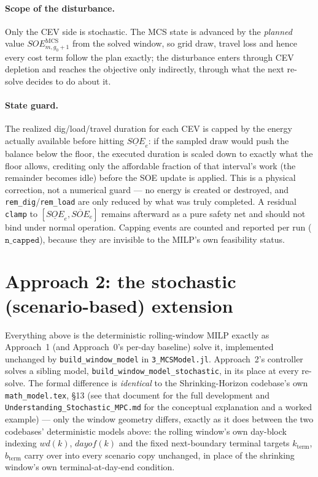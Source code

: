\documentclass[11pt]{article}
\begin{document}
\paragraph{Scope of the disturbance.} Only the CEV side is stochastic. The MCS state is advanced
by the \emph{planned} value $SOE^{\text{MCS}}_{m,g_0+1}$ from the solved window, so grid draw,
travel loss and hence every cost term follow the plan exactly; the disturbance enters through CEV
depletion and reaches the objective only indirectly, through what the next re-solve decides to do
about it.

\paragraph{State guard.} The realized dig/load/travel duration for each CEV is capped by the
energy actually available before hitting $\underline{SOE}_e$: if the sampled draw would push the
balance below the floor, the executed duration is scaled down to exactly what the floor allows,
crediting only the affordable fraction of that interval's work (the remainder becomes idle) before
the SOE update is applied. This is a physical correction, not a numerical guard — no energy is
created or destroyed, and \texttt{rem\_dig}/\texttt{rem\_load} are only reduced by what was truly
completed. A residual \texttt{clamp} to $[\underline{SOE}_e,\overline{SOE}_e]$ remains afterward as
a pure safety net and should not bind under normal operation. Capping events are counted and
reported per run ($\texttt{n\_capped}$), because they are invisible to the MILP's own feasibility
status.

\section{Approach 2: the stochastic (scenario-based) extension}
\label{sec:stochastic}
Everything above is the deterministic rolling-window MILP exactly as Approach~1 (and
Approach~0's per-day baseline) solve it, implemented unchanged by \texttt{build\_window\_model}
in \texttt{3\_MCSModel.jl}. Approach~2's controller solves a sibling model,
\texttt{build\_window\_model\_stochastic}, in its place at every re-solve. The formal
difference is \emph{identical} to the Shrinking-Horizon codebase's own \texttt{math\_model.tex},
\S13
(see that document for the full development and \texttt{Understanding\_Stochastic\_MPC.md} for
the conceptual explanation and a worked example) — only the window geometry differs, exactly
as it does between the two codebases' deterministic models above: the rolling window's own
day-block indexing $wd(k)$, $dayof(k)$ and the fixed next-boundary terminal targets
$k_{\text{term}}$, $b_{\text{term}}$ carry over into every scenario copy unchanged, in place of
the shrinking window's own terminal-at-day-end condition.
\end{document}

